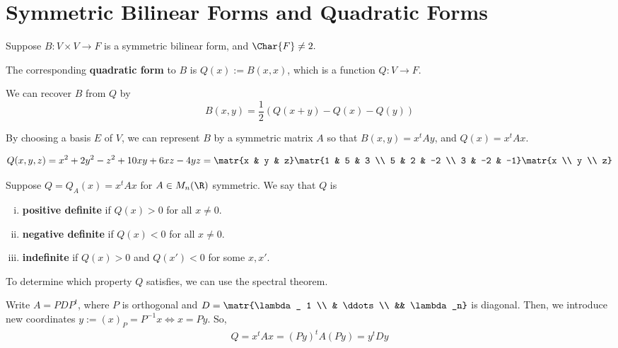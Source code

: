\section{Symmetric Bilinear Forms and Quadratic Forms}

Suppose $B:V \times V \to F$ is a symmetric bilinear form, and $\Char{F} \neq 2.$

\begin{defn}
    The corresponding \textbf{quadratic form} to $B$ is $Q(x) := B(x,x)$, which is a function $Q:V \to F$.
\end{defn}

\begin{rmk}
    We can recover $B$ from $Q$ by
    $$B(x,y) = \frac{1}{2}(Q(x+y)-Q(x)-Q(y))$$
\end{rmk}

By choosing a basis $E$ of $V$, we can represent $B$ by a symmetric matrix $A$ so that $B(x,y) = x^tAy$, and $Q(x) = x^tAx$.

\begin{ex}
    \begin{align*}
        Q(x,y,z) = x^2 + 2y^2 - z^2 + 10xy + 6xz - 4yz = \matr{x & y & z} \matr{1 & 5 & 3 \\ 5 & 2 & -2 \\ 3 & -2 & -1}\matr{x \\ y \\ z}
    \end{align*}
\end{ex}

\begin{defn}
    Suppose $Q=Q_A(x) = x^tAx$ for $A \in M_n(\R)$ symmetric. We say that $Q$ is
    \begin{enumerate}[(i)]
        \item \textbf{positive definite} if $Q(x)>0$ for all $x \neq 0$.
        \item \textbf{negative definite} if $Q(x)<0$ for all $x \neq 0$.
        \item \textbf{indefinite} if $Q(x)>0$ and $Q(x')<0$ for some $x,x'$.
    \end{enumerate}
\end{defn}

To determine which property $Q$ satisfies, we can use the spectral theorem.

Write $A= PDP^t$, where $P$ is orthogonal and $D=\matr{\lambda _ 1 \\ & \ddots \\ && \lambda _n}$ is diagonal. Then, we introduce new coordinates $y:=(x)_P=P^{-1}x \iff x=Py$. So,
\begin{align*}
    Q = x^tAx = (Py)^t A (Py) = y^t Dy
\end{align*}

